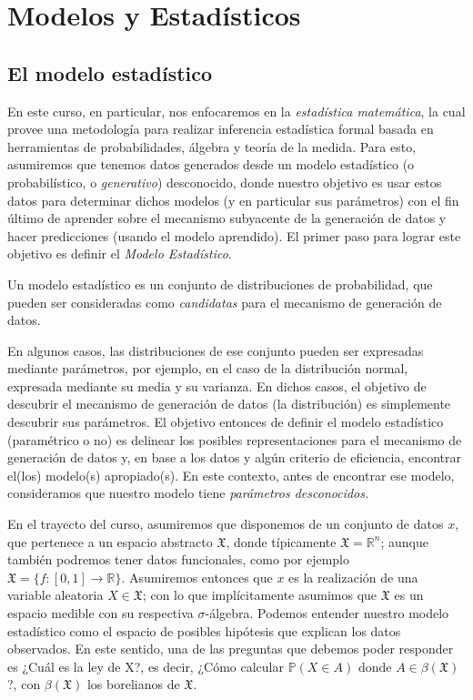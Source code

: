 
\chapter{Modelos y Estadísticos}


\section{El modelo estadístico}

En este curso, en particular, nos enfocaremos en la \emph{estadística matemática}, la cual provee una metodología para realizar inferencia estadística formal basada en herramientas de probabilidades, álgebra y teoría de la medida. Para esto, asumiremos que tenemos datos generados desde un modelo estadístico (o probabilístico, o \emph{generativo}) desconocido, donde nuestro objetivo es usar estos datos para determinar dichos modelos (y en particular sus parámetros) con el fin último de aprender sobre el mecanismo subyacente de la generación de datos y hacer predicciones (usando el modelo aprendido). El primer paso para lograr este objetivo es definir el \emph{Modelo Estadístico}.

\begin{definition} 
Un modelo estadístico es un conjunto de distribuciones de probabilidad, que pueden ser consideradas como \emph{candidatas} para el mecanismo de generación de datos. 
\end{definition}

En algunos casos, las distribuciones de ese conjunto pueden ser expresadas mediante parámetros, por ejemplo, en el caso de la distribución normal, expresada mediante su media y su varianza. En dichos casos, el objetivo  de descubrir el mecanismo de generación de datos (la distribución) es simplemente descubrir sus parámetros.  El objetivo entonces de definir el modelo estadístico (paramétrico o no) es delinear los posibles representaciones para el mecanismo de generación de datos y, en base a los datos y algún criterio de eficiencia, encontrar el(los) modelo(s) apropiado(s). En este contexto, antes de encontrar ese modelo, consideramos que nuestro modelo tiene \emph{parámetros desconocidos.}

En el trayecto del curso, asumiremos que disponemos de un conjunto de datos $x$, que pertenece a un espacio abstracto $\mathfrak{X}$, donde típicamente $\mathfrak{X} = \mathbb{R}^n$; aunque también podremos tener datos funcionales, como por ejemplo $\mathfrak{X} = \{f:[0,1]\rightarrow \mathbb{R} \}$. Asumiremos entonces  que $x$ es la realización de una variable aleatoria $X\in\mathfrak{X}$; con lo que implícitamente asumimos que $\mathfrak{X}$ es un espacio medible con su respectiva $\sigma$-álgebra. Podemos entender nuestro modelo estadístico como el espacio de posibles hipótesis que explican los datos observados. En este sentido, una de las preguntas que debemos poder responder es ¿Cuál es la ley de X?, es decir, ¿Cómo calcular $\mathbb{P} (X\in A)$ donde $A \in \beta (\mathfrak{X})$?, con $\beta (\mathfrak{X})$ los borelianos de $\mathfrak{X}$.

